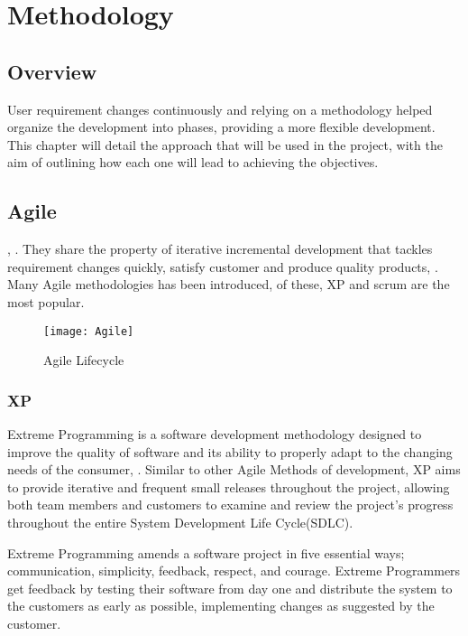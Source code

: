 \chapter{Methodology}
\label{chap:methodology}
\section{Overview}
User requirement changes continuously and relying on a methodology helped organize the development into phases, providing a more flexible development. This chapter will detail the approach that will be used in the project, with the aim of outlining how each one will lead to achieving the objectives.
\section{Agile}
, \cite{maruping2009control}.
 They share the property of iterative incremental development that tackles requirement changes quickly, satisfy customer and produce quality products, \cite{6633925}.
Many Agile methodologies has been introduced, of these, XP and scrum are the most popular.

	\begin{figure}[h]
	\centering
	\texttt{[image: Agile]}
	\caption{Agile Lifecycle}
	\label{fig:agile_lifecycle}
\end{figure}

\subsection{XP}
Extreme Programming is a software development methodology designed to improve the quality of software and its ability to properly adapt to the changing needs of the consumer, \cite{ExtremeP63:online}.
Similar to other Agile Methods of development, XP aims to provide iterative and frequent small releases throughout the project, allowing both team members and customers to examine and review the project’s progress throughout the entire System Development Life Cycle(SDLC).

Extreme Programming amends a software project in five essential ways; communication, simplicity, feedback, respect, and courage. Extreme Programmers get feedback by testing their software from day one and distribute the system to the customers as early as possible, implementing changes as suggested by the customer.
